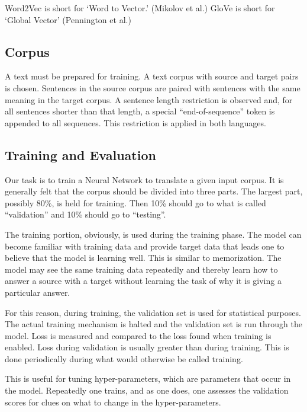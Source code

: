 Word2Vec is short for \textquoteleft Word to Vector.\textquoteright{} (Mikolov et al.) \cite{mikolov2013efficient} GloVe is short for \textquoteleft Global Vector\textquoteright{} (Pennington et al.) \cite{pennington-etal-2014-glove} 


\subsection{Corpus}

A text must be prepared for training. A text corpus with source and target pairs is chosen. Sentences in the source corpus are paired with sentences with the same meaning in the target corpus. A sentence length restriction is observed and, for all sentences shorter than that length, a special ``end-of-sequence'' token is appended to all sequences. This restriction is applied in both languages.

\subsection{Training and Evaluation}
Our task is to train a Neural Network to translate a given input corpus. It is generally felt that the corpus should be divided into three parts. The largest part, possibly 80\%, is held for training. Then 10\% should go to what is called ``validation'' and 10\% should go to ``testing''.

The training portion, obviously, is used during the training phase. The model can become familiar with training data and provide target data that leads one to believe that the model is learning well. This is similar to memorization. The model may see the same training data repeatedly and thereby learn how to answer a source with a target without learning the task of why it is giving a particular answer.

For this reason, during training, the validation set is used for statistical purposes. The actual training mechanism is halted and the validation set is run through the model. Loss is measured and compared to the loss found when training is enabled. Loss during validation is usually greater than during training. This is done periodically during what would otherwise be called training.

This is useful for tuning hyper-parameters, which are parameters that occur in the model. Repeatedly one trains, and as one does, one assesses the validation scores for clues on what to change in the hyper-parameters. 


